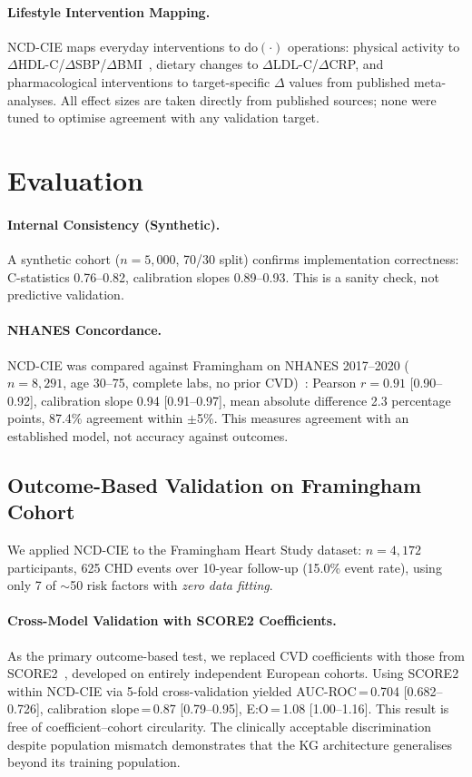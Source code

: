 \documentclass[runningheads]{llncs}
\begin{document}
\paragraph{Lifestyle Intervention Mapping.}
NCD-CIE maps everyday interventions to $\mathrm{do}(\cdot)$
operations: physical activity to $\Delta$HDL-C/$\Delta$SBP/$\Delta$BMI~\cite{naci2018comparative},
dietary changes to $\Delta$LDL-C/$\Delta$CRP, and
pharmacological interventions to target-specific $\Delta$ values
from published meta-analyses.
All effect sizes are taken directly from published sources;
none were tuned to optimise agreement with any validation target.

\section{Evaluation}\label{sec:validation}

\paragraph{Internal Consistency (Synthetic).}
A synthetic cohort ($n = 5{,}000$, 70/30 split) confirms
implementation correctness: C-statistics 0.76--0.82, calibration
slopes 0.89--0.93.
This is a sanity check, not predictive validation.

\paragraph{NHANES Concordance.}
NCD-CIE was compared against Framingham on NHANES 2017--2020
($n = 8{,}291$, age 30--75, complete labs, no prior
CVD)~\cite{nhanes2020}: Pearson $r = 0.91$ [0.90--0.92],
calibration slope 0.94 [0.91--0.97], mean absolute difference
2.3 percentage points, 87.4\% agreement within $\pm$5\%.
This measures agreement with an established model, not accuracy
against outcomes.

\subsection{Outcome-Based Validation on Framingham Cohort}\label{sec:framingham}

We applied NCD-CIE to the Framingham Heart Study dataset:
$n = 4{,}172$ participants, 625 CHD events over 10-year follow-up
(15.0\% event rate), using only 7 of ${\sim}$50 risk factors
with \emph{zero data fitting}.

\paragraph{Cross-Model Validation with SCORE2 Coefficients.}
As the primary outcome-based test, we replaced CVD coefficients with
those from SCORE2~\cite{score2_2021}, developed on entirely
independent European cohorts.
Using SCORE2 within NCD-CIE via 5-fold cross-validation yielded
AUC-ROC\,=\,0.704 [0.682--0.726], calibration slope\,=\,0.87
[0.79--0.95], E:O\,=\,1.08 [1.00--1.16].
This result is free of coefficient--cohort circularity.
The clinically acceptable discrimination despite population mismatch
demonstrates that the KG architecture generalises beyond its
training population.
\end{document}
